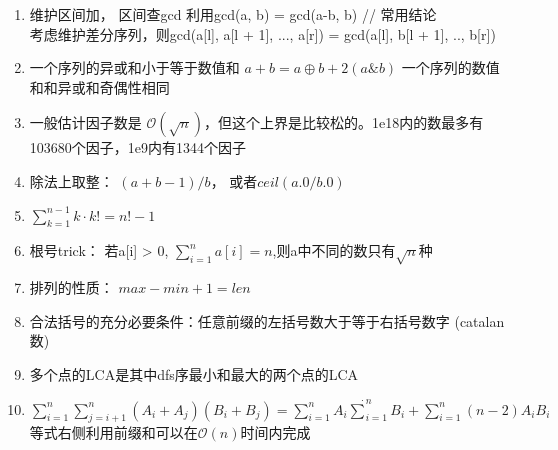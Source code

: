 \documentclass[a4paper]{ctexart}
\begin{document}
\begin{enumerate}
	\item 维护区间加， 区间查gcd
	利用gcd(a, b) = gcd(a-b, b)  // 常用结论 \\
	考虑维护差分序列，则gcd(a[l], a[l + 1], ..., a[r]) = gcd(a[l], b[l + 1], .., b[r])
	\item
	  \subitem 一个序列的异或和小于等于数值和 $a+b=a \oplus b+2(a \& b)$
	  \subitem 一个序列的数值和和异或和奇偶性相同

	\item 一般估计因子数是 $\mathcal{O}(\sqrt{n})$，但这个上界是比较松的。1e18内的数最多有103680个因子，1e9内有1344个因子

	\item 除法上取整： $(a + b - 1) / b$， 或者$ceil(a.0 / b.0)$
	\item $\sum_{k=1}^{n-1}{k \cdot k!} = n! - 1$
	\item 根号trick：
	若a[i] > 0, $\sum_{i=1}^{n} a[i] = n$,则a中不同的数只有$\sqrt{n}$种
	\item 排列的性质： $ max - min + 1 = len $
	\item 合法括号的充分必要条件：任意前缀的左括号数大于等于右括号数字 (catalan数)
	\item 多个点的LCA是其中dfs序最小和最大的两个点的LCA
	\item $\sum_{i = 1}^{n}\sum_{j = i + 1}^{n}(A_i + A_j)(B_i + B_j) = \sum_{i = 1}^{n}A_i \dot \sum_{i = 1}^{n}B_i + \sum_{i = 1}^{n}(n - 2)A_i B_i$等式右侧利用前缀和可以在$\mathcal{O}(n)$时间内完成
	
\end{enumerate}
\end{document}
